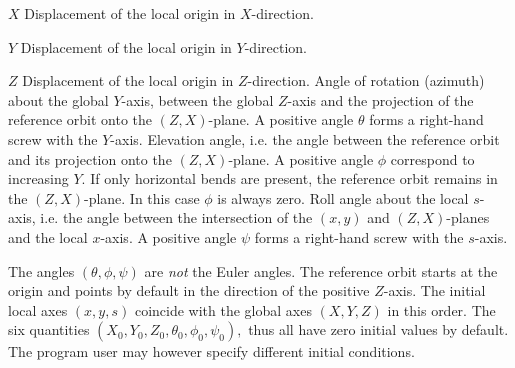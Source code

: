 \begin{mylist}
\item[$X$]
Displacement of the local origin in $X$-direction.
\item[$Y$]
Displacement of the local origin in $Y$-direction.
\item[$Z$]
Displacement of the local origin in $Z$-direction.
\keyitem{$\theta$}
Angle of rotation (azimuth) about the global $Y$-axis,
between the global $Z$-axis and the projection
of the reference orbit onto the $(Z, X)$-plane.
A positive angle $\theta$ forms a right-hand screw with the
$Y$-axis.
\keyitem{$\phi$}
Elevation angle,
i.e. the angle between the reference orbit and its projection
onto the $(Z, X)$-plane.
A positive angle $\phi$ correspond to increasing $Y$.
If only horizontal bends are present,
the reference orbit remains in the $(Z, X)$-plane.
In this case $\phi$ is always zero.
\keyitem{$\psi$}
Roll angle about the local $s$-axis,
i.e. the angle between the intersection
of the $(x, y)$ and $(Z, X)$-planes and the local $x$-axis.
A positive angle $\psi$ forms a right-hand screw with the $s$-axis.
\end{mylist}
The angles $(\theta, \phi, \psi)$ are {\it not} the Euler angles.
The reference orbit starts at the origin and points by default
in the direction of the positive $Z$-axis.
The initial local axes $(x, y, s)$ coincide with the global axes
$(X, Y, Z)$ in this order.
The six quantities
$(X_{0}, Y_{0}, Z_{0}, \theta_{0}, \phi_{0}, \psi_{0}),$
thus all have zero initial values by default.
The program user may however specify different initial conditions.
 

